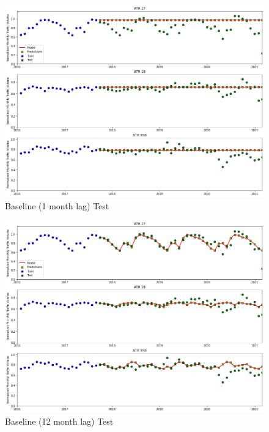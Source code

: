 \documentclass[9pt,twocolumn,twoside, lineno]{jost-new}
\numberwithin{subsection}{section}
\begin{document}
\begin{figure}
\centering
    \includegraphics[width=14.4cm]{figures/model_baseline_1M_zoomed.png}
\caption{Baseline (1 month lag) Test}
\label{fig:model_baseline_1M_zoomed}
\end{figure}

\begin{figure}
\centering
    \includegraphics[width=14.4cm]{figures/model_baseline_12M_zoomed.png}
\caption{Baseline (12 month lag) Test}
\label{fig:model_baseline_12M_zoomed}
\end{figure}
\end{document}
